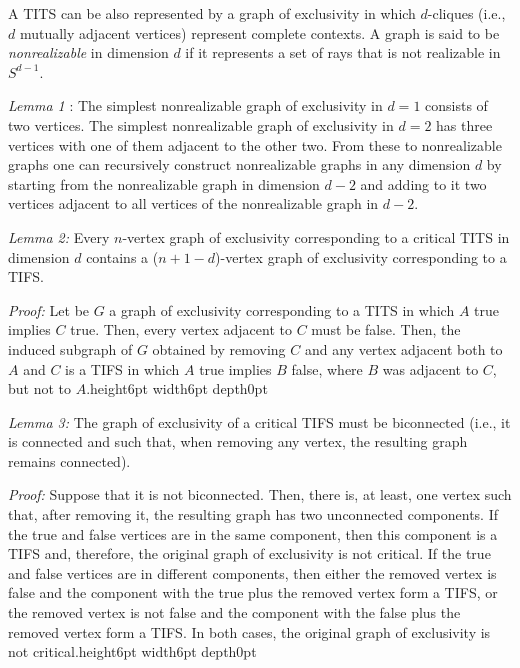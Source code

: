 \documentclass[%
 twocolumn,
 groupedaddress,
 showpacs,
 showkeys,
 preprintnumbers,
 amsmath,amssymb,
 aps,
 pra,
 longbibliography,
 floatfix,
 ]{revtex4-1}
\def\endproof{\vrule height6pt width6pt depth0pt}
\begin{document}

A TITS can be also represented by a graph of exclusivity in which $d$-cliques (i.e., $d$ mutually adjacent vertices) represent complete contexts. A graph is said to be \emph{nonrealizable} in dimension $d$ if it represents a set of rays that is not realizable in $S^{d-1}.$


{\em Lemma 1} \cite{CDLP13}: The simplest nonrealizable graph of exclusivity in $d=1$ consists of two vertices. The simplest nonrealizable graph of exclusivity in $d=2$ has three vertices with one of them adjacent to the other two. From these to nonrealizable graphs one can recursively construct nonrealizable graphs in any dimension $d$ by starting from the nonrealizable graph in dimension $d-2$ and adding to it two vertices adjacent to all vertices of the nonrealizable graph in $d-2$.


{\em Lemma 2:} Every $n$-vertex graph of exclusivity corresponding to a critical TITS in dimension $d$ contains a ($n+1-d$)-vertex graph of exclusivity corresponding to a TIFS.


{\em Proof:} Let be $G$ a graph of exclusivity corresponding to a TITS in which $A$ true implies $C$ true. Then, every vertex adjacent to $C$ must be false. Then, the induced subgraph of $G$ obtained by removing $C$ and any vertex adjacent both to $A$ and $C$ is a TIFS in which $A$ true implies $B$ false, where $B$ was adjacent to $C$, but not to $A$.\hfill \endproof


{\em Lemma 3:} The graph of exclusivity of a critical TIFS must be biconnected
(i.e., it is connected and such that, when removing any vertex, the resulting graph remains connected).


{\em Proof:} Suppose that it is not biconnected. Then, there is, at least, one vertex such that, after removing it, the resulting graph has two unconnected components. If the true and false vertices are in the same component, then this component is a TIFS and, therefore, the original graph of exclusivity is not critical. If the true and false vertices are in different components, then either the removed vertex is false and the component with the true plus the removed vertex form a TIFS, or the removed vertex is not false and the component with the false plus the removed vertex form a TIFS. In both cases, the original graph of exclusivity is not critical.\hfill \endproof
\end{document}
